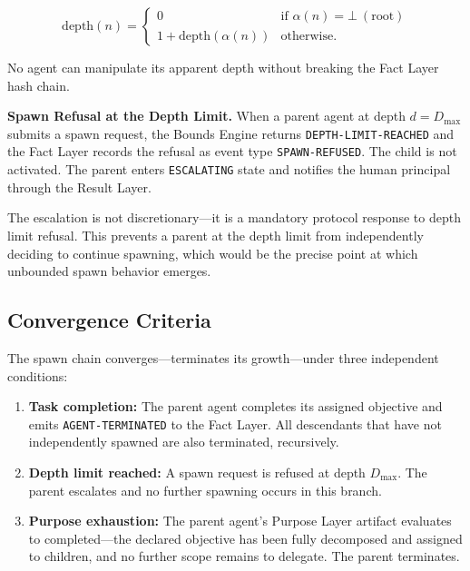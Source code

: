 \begin{equation}
\mathrm{depth}(n) =
\begin{cases}
0 & \text{if }\alpha(n) = \bot\ (\text{root}) \\
1 + \mathrm{depth}(\alpha(n)) & \text{otherwise}.
\end{cases}
\label{eq:depth}
\end{equation}

No agent can manipulate its apparent depth without breaking the Fact Layer hash chain.

\medskip
\noindent\textbf{Spawn Refusal at the Depth Limit.} When a parent agent at depth $d = D_{\max}$ submits a spawn request, the Bounds Engine returns \texttt{DEPTH-LIMIT-REACHED} and the Fact Layer records the refusal as event type \texttt{SPAWN-REFUSED}. The child is not activated. The parent enters \texttt{ESCALATING} state and notifies the human principal through the Result Layer.

The escalation is not discretionary---it is a mandatory protocol response to depth limit refusal. This prevents a parent at the depth limit from independently deciding to continue spawning, which would be the precise point at which unbounded spawn behavior emerges.

\subsection{Convergence Criteria}

The spawn chain converges---terminates its growth---under three independent conditions:

\begin{enumerate}
  \item[(CC-1)] \textbf{Task completion:} The parent agent completes its assigned objective and emits \texttt{AGENT-TERMINATED} to the Fact Layer. All descendants that have not independently spawned are also terminated, recursively.

  \item[(CC-2)] \textbf{Depth limit reached:} A spawn request is refused at depth $D_{\max}$. The parent escalates and no further spawning occurs in this branch.

  \item[(CC-3)] \textbf{Purpose exhaustion:} The parent agent's Purpose Layer artifact evaluates to completed---the declared objective has been fully decomposed and assigned to children, and no further scope remains to delegate. The parent terminates.
\end{enumerate}

